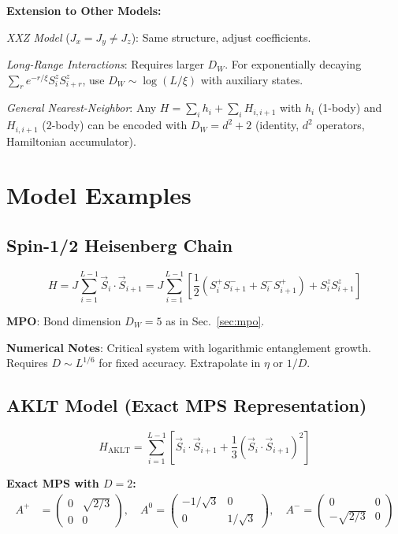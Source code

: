 \documentclass[aps,prb,onecolumn,scriptaddress]{revtex4-2}
\begin{document}
\textbf{Extension to Other Models:}

\textit{XXZ Model} ($J_x = J_y \neq J_z$): Same structure, adjust coefficients.

\textit{Long-Range Interactions}: Requires larger $D_W$. For exponentially decaying $\sum_{r} e^{-r/\xi} S_i^z S_{i+r}^z$, use $D_W \sim \log(L/\xi)$ with auxiliary states.

\textit{General Nearest-Neighbor}: Any $H = \sum_i h_i + \sum_i H_{i,i+1}$ with $h_i$ (1-body) and $H_{i,i+1}$ (2-body) can be encoded with $D_W = d^2 + 2$ (identity, $d^2$ operators, Hamiltonian accumulator).

\section{Model Examples}

\subsection{Spin-1/2 Heisenberg Chain}
\begin{equation}
H = J \sum_{i=1}^{L-1} \vec{S}_i \cdot \vec{S}_{i+1} = J \sum_{i=1}^{L-1} \left[ \frac{1}{2}\left(S_i^+ S_{i+1}^- + S_i^- S_{i+1}^+\right) + S_i^z S_{i+1}^z \right]
\end{equation}

\textbf{MPO}: Bond dimension $D_W=5$ as in Sec.~\ref{sec:mpo}.

\textbf{Numerical Notes}: Critical system with logarithmic entanglement growth. Requires $D \sim L^{1/6}$ for fixed accuracy. Extrapolate in $\eta$ or $1/D$.

\subsection{AKLT Model (Exact MPS Representation)}
\begin{equation}
H_{\text{AKLT}} = \sum_{i=1}^{L-1} \left[ \vec{S}_i \cdot \vec{S}_{i+1} + \frac{1}{3} (\vec{S}_i \cdot \vec{S}_{i+1})^2 \right]
\end{equation}

\textbf{Exact MPS with $D=2$:}
\begin{align}
A^{+} &= \begin{pmatrix} 0 & \sqrt{2/3} \\ 0 & 0 \end{pmatrix}, \quad
A^{0} = \begin{pmatrix} -1/\sqrt{3} & 0 \\ 0 & 1/\sqrt{3} \end{pmatrix}, \quad
A^{-} = \begin{pmatrix} 0 & 0 \\ -\sqrt{2/3} & 0 \end{pmatrix}
\end{align}
\end{document}
